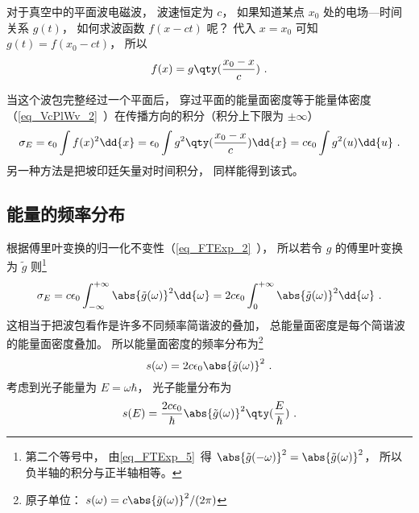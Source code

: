 

对于真空中的平面波电磁波， 波速恒定为 $c$， 如果知道某点 $x_0$ 处的电场—时间关系 $g(t)$， 如何求波函数 $f(x - ct)$ 呢？ 代入 $x = x_0$ 可知 $g(t) = f(x_0 - ct)$， 所以
\begin{equation}
f(x) = g\qty(\frac{x_0 - x}{c})~.
\end{equation}

当这个波包完整经过一个平面后， 穿过平面的能量面密度等于能量体密度（\autoref{eq_VcPlWv_2}~）在传播方向的积分（积分上下限为 $\pm\infty$）
\begin{equation}\label{eq_WpEng_1}
\sigma_E = \epsilon_0 \int f(x)^2 \dd{x} = \epsilon_0  \int g^2\qty(\frac{x_0 - x}{c}) \dd{x} = c\epsilon_0 \int g^2(u) \dd{u}~.
\end{equation}
另一种方法是把坡印廷矢量对时间积分， 同样能得到该式。

\subsection{能量的频率分布}
根据傅里叶变换的归一化不变性（\autoref{eq_FTExp_2}~）， 所以若令 $g$ 的傅里叶变换为 $\tilde g$ 则\footnote{第二个等号中， 由\autoref{eq_FTExp_5}~得 $\abs{\tilde g(-\omega)}^2 = \abs{\tilde g(\omega)}^2$， 所以负半轴的积分与正半轴相等。}
\begin{equation}
\sigma_E = c\epsilon_0 \int_{-\infty}^{+\infty} \abs{\tilde g(\omega)}^2 \dd{\omega} = 2c\epsilon_0 \int_{0}^{+\infty} \abs{\tilde g(\omega)}^2 \dd{\omega}~.
\end{equation}
这相当于把波包看作是许多不同频率简谐波的叠加， 总能量面密度是每个简谐波的能量面密度叠加。 所以能量面密度的频率分布为\footnote{原子单位： $s(\omega) = c \abs{\tilde g(\omega)}^2/(2\pi)$}
\begin{equation}\label{eq_WpEng_3}
s(\omega) = 2c\epsilon_0 \abs{\tilde g(\omega)}^2~.
\end{equation}
考虑到光子能量为 $E = \omega\hbar$， 光子能量分布为
\begin{equation}\label{eq_WpEng_2}
s(E) = \frac{2c\epsilon_0}{\hbar} \abs{\tilde g(\omega)}^2 \qty(\frac{E}{\hbar})~.
\end{equation}

